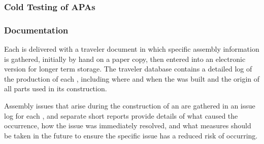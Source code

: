 \subsubsection{Cold Testing of APAs}
\label{sec:fdsp-apa-prod-coldtest}



\subsubsection{Documentation} 
\label{sec:fdsp-apa-prod-doc}

Each  is delivered with a traveler document in which specific assembly information is gathered, initially by hand on a paper copy, then entered into an electronic version for longer term storage.  The traveler database contains a detailed log of the production of each , including where and when the  was built and the origin of all parts used in its construction. 

Assembly issues that arise during the construction of an  are gathered in an issue log for each , and separate short reports provide details of what caused the occurrence, how the issue was immediately resolved, and what measures should be taken in the future to ensure the specific issue has a reduced risk of occurring.  


